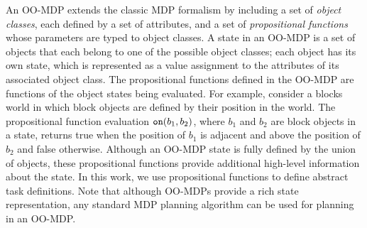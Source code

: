 \documentclass[conference]{IEEEtran}
\begin{document}
An OO-MDP extends the classic MDP formalism by including a set of {\em object classes}, each defined by a set of attributes, and a set of \emph{propositional functions} whose parameters are typed to object classes. A state in an OO-MDP is a set of objects that each belong to one of the possible object classes; each object has its own state, which is represented as a value assignment to the attributes of its associated object class. The propositional functions defined in the OO-MDP are functions of the object states being evaluated. For example, consider a blocks world in which block objects are defined by their position in the world. The propositional function evaluation ${\tt on}(b_1, b_2)$, where $b_1$ and $b_2$ are block objects in a state, returns {\sf true} when the position of $b_1$ is adjacent and above the position of $b_2$ and false otherwise. Although an OO-MDP state is fully defined by the union of objects, these propositional functions provide additional high-level information about the state. In this work, we use propositional functions to define abstract task definitions.  Note that although OO-MDPs provide a rich state representation, any standard MDP planning algorithm can be used for planning in an OO-MDP.


\end{document}
